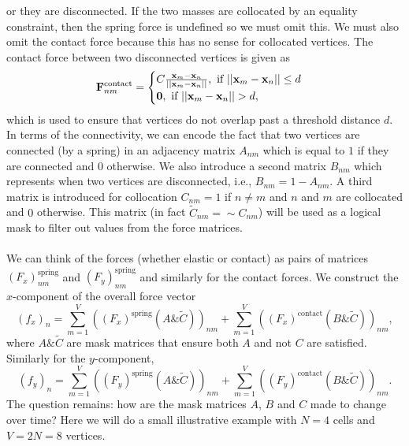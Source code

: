 or they are disconnected. If the two masses are collocated by an equality constraint, then the 
spring force is undefined so we must omit this. We must also omit the contact force because this 
has no sense for collocated vertices. The contact force between two disconnected vertices is given as
\begin{equation*}
    \vb{F}_{nm}^{\textrm{contact}} =
    \begin{cases} 
        C\frac{\vb{x}_m - \vb{x}_n}{|| \vb{x}_m - \vb{x}_n||}, \ \textrm{if} \ || \vb{x}_m - \vb{x}_n|| \leq d \\
        \vb{0}, \ \textrm{if} \ || \vb{x}_m - \vb{x}_n|| > d,
    \end{cases}
\end{equation*}
which is used to ensure that vertices do not overlap past a threshold distance $d$. In terms of the 
connectivity, we can encode the fact that two vertices are connected (by a spring) in an adjacency matrix
$A_{nm}$ which is equal to $1$ if they are connected and $0$ otherwise. We also introduce a second matrix
$B_{nm}$ which represents when two vertices are disconnected, i.e., $B_{nm} = 1 - A_{nm}$. A third matrix 
is introduced for collocation $C_{nm} = 1$ if $n \neq m$ and $n$ and $m$ are collocated and $0$ otherwise.
This matrix (in fact $\tilde{C}_{nm} = \sim C_{nm}$) will be used as a logical mask to filter out 
 values from the force matrices. 
\\
\\
We can think of the forces (whether elastic or contact) as pairs of matrices $(F_x)_{nm}^{\textrm{spring}}$ and 
$(F_y)_{nm}^{\textrm{spring}}$ and similarly for the contact forces. We construct the $x$-component of 
the overall force vector
\begin{equation*}
    (f_x)_n = 
    \sum_{m=1}^V((F_x)^{\textrm{spring}}(A {\&}  \tilde{C}))_{nm} + 
    \sum_{m=1}^V((F_x)^{\textrm{contact}}( B  {\&}  \tilde{C}))_{nm} ,
\end{equation*}
where $A  {\&}  \tilde{C}$ are mask matrices that ensure both $A$ and not $C$ are satisfied. Similarly for the 
$y$-component,
\begin{equation*}
    (f_y)_n = 
    \sum_{m=1}^V((F_y)^{\textrm{spring}}(A {\&}  \tilde{C}))_{nm} + 
    \sum_{m=1}^V((F_y)^{\textrm{contact}}( B  {\&}  \tilde{C}))_{nm}.
\end{equation*}
The question remains: how are the mask matrices $A$, $B$ and $C$ made to change over time? Here we will do
a small illustrative example with $N=4$ cells and $V=2N = 8$ vertices. 
